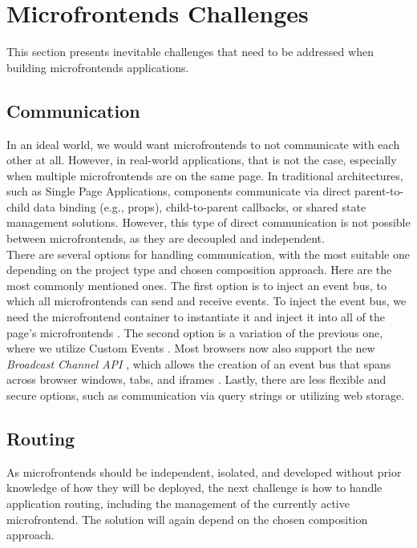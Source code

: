 \section{Microfrontends Challenges}
This section presents inevitable challenges that need to be addressed when building microfrontends applications.

\subsection{Communication}
In an ideal world, we would want microfrontends to not communicate with each other at all. However, in real-world applications, that is not the case, especially when multiple microfrontends are on the same page. In traditional architectures, such as Single Page Applications, components communicate via direct parent-to-child data binding (e.g., props), child-to-parent callbacks, or shared state management solutions. However, this type of direct communication is not possible between microfrontends, as they are decoupled and independent. \\

\noindent
There are several options for handling communication, with the most suitable one depending on the project type and chosen composition approach. Here are the most commonly mentioned ones. The first option is to inject an event bus, to which all microfrontends can send and receive events. To inject the event bus, we need the microfrontend container to instantiate it and inject it into all of the page's microfrontends \cite{MezzaliraBuildingMf}. The second option is a variation of the previous one, where we utilize Custom Events \cite{MezzaliraBuildingMf}\cite{Geers}. Most browsers now also support the new \emph{Broadcast Channel API} \cite{BroadcastChannelAPI}, which allows the creation of an event bus that spans across browser windows, tabs, and iframes \cite{Geers}. Lastly, there are less flexible and secure options, such as communication via query strings \cite{MezzaliraBuildingMf} or utilizing web storage.

\subsection{Routing}
As microfrontends should be independent, isolated, and developed without prior knowledge of how they will be deployed, the next challenge is how to handle application routing, including the management of the currently active microfrontend. The solution will again depend on the chosen composition approach. \\

